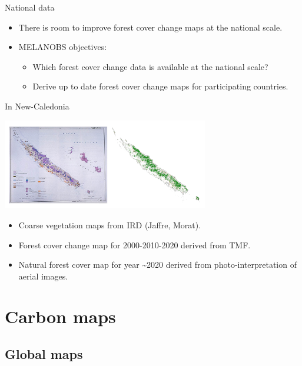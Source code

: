 \documentclass[10pt,table,dvipsnames,compress]{beamer}
\begin{document}
\begin{frame}[label={sec:org56b6179}]{National data}
\begin{itemize}
\item There is room to improve forest cover change maps at the national scale.

\item MELANOBS objectives:
\begin{itemize}
\item Which forest cover change data is available at the national scale?
\item Derive up to date forest cover change maps for participating countries.
\end{itemize}
\end{itemize}
\end{frame}

\begin{frame}[label={sec:orga346cb1}]{In New-Caledonia}
\begin{center}
\includegraphics[width=9cm]{figs/fcc/fcc_nc.png}
\end{center}

\begin{itemize}
\item Coarse vegetation maps from IRD (Jaffre, Morat).
\item Forest cover change map for 2000-2010-2020 derived from TMF.
\item Natural forest cover map for year \textasciitilde{}2020 derived from photo-interpretation of aerial images.
\end{itemize}
\end{frame}

\section{Carbon maps}
\label{sec:org0ff883c}

\subsection{Global maps}
\label{sec:orga7bf732}
\end{document}
